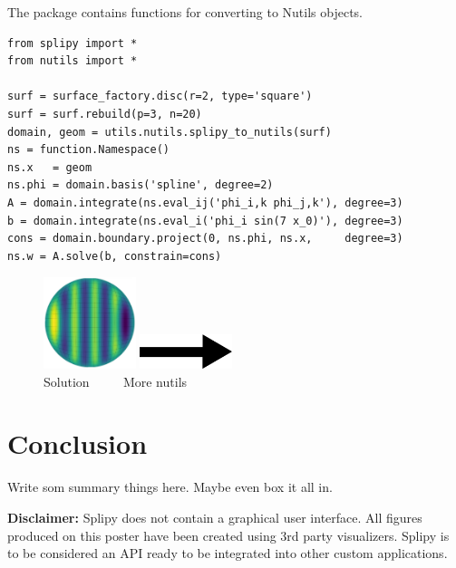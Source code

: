 \documentclass[landscape]{sintefposter}
\begin{document}
\begin{multicols}{3}
\begin{tcolorbox}[colback=white,colframe=sintefblue,title=Integration with Nutils]
  The package contains functions for converting to Nutils objects.
  \begin{tcolorbox}[colback=sinteflightgrey]
  \begin{Verbatim}[fontsize=\footnotesize]
from splipy import *
from nutils import *

surf = surface_factory.disc(r=2, type='square')
surf = surf.rebuild(p=3, n=20)
domain, geom = utils.nutils.splipy_to_nutils(surf)
ns = function.Namespace()
ns.x   = geom
ns.phi = domain.basis('spline', degree=2)
A = domain.integrate(ns.eval_ij('phi_i,k phi_j,k'), degree=3)
b = domain.integrate(ns.eval_i('phi_i sin(7 x_0)'), degree=3)
cons = domain.boundary.project(0, ns.phi, ns.x,     degree=3)
ns.w = A.solve(b, constrain=cons)
\end{Verbatim}
  \end{tcolorbox}
\end{tcolorbox}
\vspace{-1cm}
\begin{figure}
  \begin{center}
    \includegraphics[width=0.24\textwidth]{nutilssolution}
    \includegraphics[width=0.24\textwidth]{right.png} \\
    Solution $\quad\quad$ More nutils
  \end{center}
\end{figure}

\section{Conclusion}

Write som summary things here.
Maybe even box it all in.

{\footnotesize \textbf{Disclaimer:}
Splipy does not contain a graphical user interface.
All figures produced on this poster have been created using 3rd party visualizers.
Splipy is to be considered an API ready to be integrated into other custom applications.
}

\end{multicols}
\end{document}
